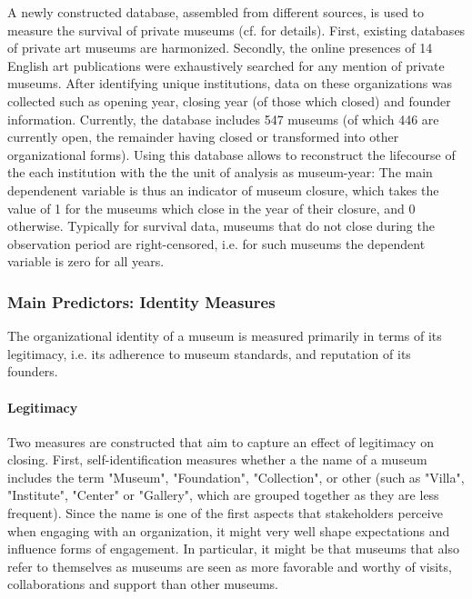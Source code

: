 \documentclass[12pt]{article}
\begin{document}
A newly constructed database, assembled from different sources,  is used to measure the survival of private museums (cf. \textcite{Velthuis_etal_2023_boom} for details).
First, existing databases of private art museums are harmonized.
Secondly, the online presences of 14 English art publications were exhaustively searched for any mention of private museums.
After identifying unique institutions, data on these organizations was collected such as opening year, closing year (of those which closed) and founder information.
Currently, the database includes 547 museums (of which 446 are currently open, the remainder having closed or transformed into other organizational forms).
Using this database allows to reconstruct the lifecourse of the each institution with the the unit of analysis as museum-year:
The main dependenent variable is thus an indicator of museum closure, which takes the value of 1 for the museums which close in the year of their closure, and 0 otherwise.
Typically for survival data, museums that do not close during the observation period are right-censored, i.e. for such museums the dependent variable is zero for all years.


\subsubsection*{Main Predictors: Identity Measures}


The organizational identity of a museum is measured primarily in terms of its legitimacy, i.e. its adherence to museum standards, and reputation of its founders.

\paragraph*{Legitimacy}


Two measures are constructed that aim to capture an effect of legitimacy on closing.
First, self-identification measures whether a the name of a museum includes the term "Museum", "Foundation", "Collection", or other (such as "Villa", "Institute", "Center" or "Gallery", which are grouped together as they are less frequent).
Since the name is one of the first aspects that stakeholders perceive when engaging with an organization, it might very well shape expectations and influence forms of engagement.
In particular, it might be that museums that also refer to themselves as museums are seen as more favorable and worthy of visits, collaborations and support than other museums.
\end{document}
